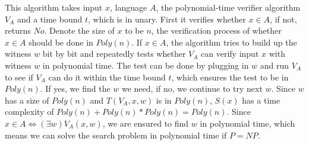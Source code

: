This algorithm takes input $x$, language $A$, the polynomial-time verifier 
algorithm $V_A$ and a time bound $t$, which is in unary. First it verifies 
whether $x \in A$, if not, returns $No$. Denote the size of $x$ to be $n$, 
the verification process of whether $x \in A$ should be done in $Poly(n)$. 
If $x \in A$, the algorithm tries to build up the witness $w$ bit by bit 
and repeatedly tests whether $V_A$ can verify input $x$ with witness $w$ 
in polynomial time. The test can be done by plugging in $w$ and run $V_A$ 
to see if $V_A$ can do it within the time bound $t$, which ensures the test 
to be in $Poly(n)$. If yes, we find the $w$ we need, if no, we continue to 
try next $w$. Since $w$ has a size of $Poly(n)$ and $T(V_A, x, w)$ is in 
$Poly(n)$, $S(x)$ has a time complexity of $Poly(n) + Poly(n)*Poly(n) = Poly(n)$. 
Since $x \in A \iff (\exists w)V_A(x, w)$, 
we are ensured to find $w$ in polynomial time, which means we can solve the 
search problem in polynomial time if $P = NP$.

